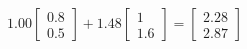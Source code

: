 \documentclass[preview]{standalone}
\begin{document}
\begin{align*}
1.00 \begin{bmatrix} 0.8 \\ 0.5 \end{bmatrix} + 1.48 \begin{bmatrix} 1 \\ 1.6 \end{bmatrix} = \begin{bmatrix} 2.28 \\ 2.87 \end{bmatrix}
\end{align*}
\end{document}
